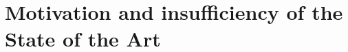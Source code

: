 
\chapter{Motivation and insufficiency of the State of the Art}
\label{cap:insufficiency}
\lipsum[1]

